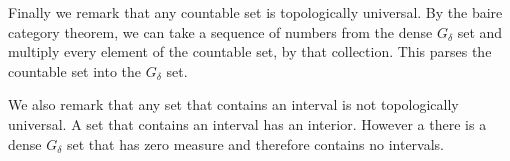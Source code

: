 Finally we remark that any countable set is topologically universal.  By the baire category theorem, we can take a sequence of numbers from the dense $G_\delta$ set and multiply every element of the countable set, by that collection.  This parses the countable set into the $G_\delta$ set. 
    
We also remark that any set that contains an interval is not topologically universal.  A set that contains an interval has an interior.  However a there is a dense $G_\delta$ set that has zero measure and therefore contains no intervals. 
